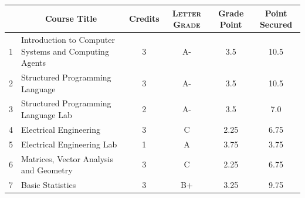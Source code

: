 \documentclass[11pt]{article}
\newcommand*{\numtwo}[1]{\pgfmathprintnumber[
                    fixed, precision=2, fixed zerofill=true]{#1}}
\begin{document}
                \begin{center}
                    \renewcommand{\arraystretch}{1.08}
                    
                \begin{tabular}{|c|l|c|>{\scshape}c|c|c|}
                \hline  \rule[-1ex]{0pt}{3.5ex} {\centering{\bf Course Code}} &  \multicolumn{1}{c|}{\textbf{Course Title}}  & {\bf Credits} & {\bf Letter Grade} & {\bf Grade Point} & {\bf Point Secured}  \\ 
                \hline   1 &  Introduction to Computer Systems and Computing Agents		 & 3 & A- & 3.5 & 10.5 \\ %
                \hline   2 &  Structured Programming Language		 & 3 & A- & 3.5 & 10.5 \\ %
                \hline   3 &  Structured Programming Language Lab		 & 2 & A- & 3.5 & 7.0 \\ %
                \hline   4 &  Electrical Engineering		 & 3 & C & 2.25 & 6.75 \\ %
                \hline   5 &  Electrical Engineering Lab		 & 1 & A & 3.75 & 3.75 \\ %
                \hline   6 &  Matrices, Vector Analysis and Geometry		 & 3 & C & 2.25 & 6.75 \\ %
                \hline   7 &  Basic Statistics		 & 3 & B+ & 3.25 & 9.75 \\ %

\hline                %
                \end{tabular}
                \end{center}
                \renewcommand{\arraystretch}{1.03}
\end{document}
